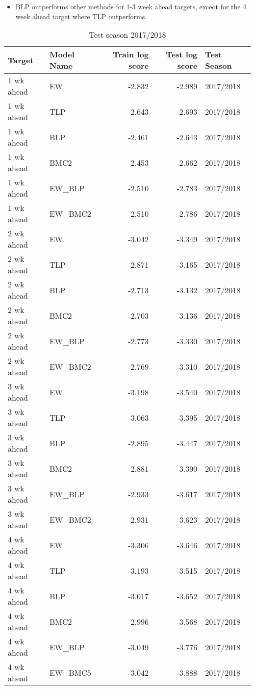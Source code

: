 \documentclass[
]{article}
\begin{document}
\begin{itemize}
\item BLP outperforms other methods for 1-3 week ahead targets, exceot for the 4 week ahead target where TLP outperforms.

\end{itemize}

\newpage

\begin{table}[H]

\caption{\label{tab:unnamed-chunk-7}Test season 2017/2018}
\centering
\begin{tabular}[t]{llrrl}
\toprule
Target & Model Name & Train log score & Test log score & Test Season\\
\midrule
1 wk ahead & EW & -2.832 & -2.989 & 2017/2018\\
1 wk ahead & TLP & -2.643 & -2.693 & 2017/2018\\
1 wk ahead & BLP & -2.461 & -2.643 & 2017/2018\\
1 wk ahead & BMC2 & -2.453 & -2.662 & 2017/2018\\
1 wk ahead & EW\_BLP & -2.510 & -2.783 & 2017/2018\\
1 wk ahead & EW\_BMC2 & -2.510 & -2.786 & 2017/2018\\
2 wk ahead & EW & -3.042 & -3.349 & 2017/2018\\
2 wk ahead & TLP & -2.871 & -3.165 & 2017/2018\\
2 wk ahead & BLP & -2.713 & -3.132 & 2017/2018\\
2 wk ahead & BMC2 & -2.703 & -3.136 & 2017/2018\\
2 wk ahead & EW\_BLP & -2.773 & -3.330 & 2017/2018\\
2 wk ahead & EW\_BMC2 & -2.769 & -3.310 & 2017/2018\\
3 wk ahead & EW & -3.198 & -3.540 & 2017/2018\\
3 wk ahead & TLP & -3.063 & -3.395 & 2017/2018\\
3 wk ahead & BLP & -2.895 & -3.447 & 2017/2018\\
3 wk ahead & BMC2 & -2.881 & -3.390 & 2017/2018\\
3 wk ahead & EW\_BLP & -2.933 & -3.617 & 2017/2018\\
3 wk ahead & EW\_BMC2 & -2.931 & -3.623 & 2017/2018\\
4 wk ahead & EW & -3.306 & -3.646 & 2017/2018\\
4 wk ahead & TLP & -3.193 & -3.515 & 2017/2018\\
4 wk ahead & BLP & -3.017 & -3.652 & 2017/2018\\
4 wk ahead & BMC2 & -2.996 & -3.568 & 2017/2018\\
4 wk ahead & EW\_BLP & -3.049 & -3.776 & 2017/2018\\
4 wk ahead & EW\_BMC5 & -3.042 & -3.888 & 2017/2018\\
\bottomrule
\end{tabular}
\end{table}
\end{document}
